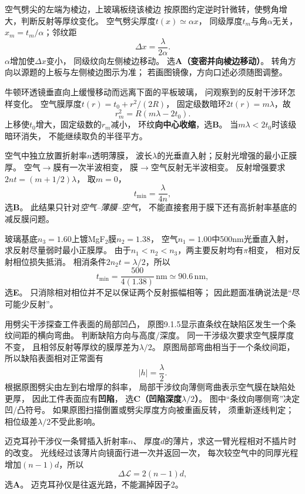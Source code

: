 \problemtext 空气劈尖的左端为棱边，上玻璃板绕该棱边
按原图约定逆时针微转，使劈角增大，判断反射等厚纹变化。
\workings
空气劈尖厚度$t(x)\simeq\alpha x$，
同级厚度$t_m$与角$\alpha$无关，
$x_m=t_m/\alpha$；邻纹距
\[
\Delta x=\frac{\lambda}{2\alpha}.
\]
$\alpha$增加使$\Delta x$变小，
同级纹向左侧棱边移动。
选\textbf{A（变密并向棱边移动）}。
\crosscheck 转角方向以源题的上板与左侧棱边图示为准；
若画图镜像，方向口述必须随图调整。

\problemtext 牛顿环透镜垂直向上缓慢移动而远离下面的平板玻璃，
问观察到的反射干涉环怎样变化。
\workings
空气膜厚度$t(r)=t_0+r^2/(2R)$，
固定级数暗环$2t(r)=m\lambda$，故
\[
r_m^2=R(m\lambda-2t_0).
\]
上移使$t_0$增大，固定级数的$r_m$减小，
环纹\textbf{向中心收缩}，选\textbf{B}。
\crosscheck 当$m\lambda<2t_0$时该级暗环消失，
不能继续取负的半径平方。

\problemtext 空气中独立放置折射率$n$透明薄膜，
波长$\lambda$的光垂直入射；反射光增强的最小正膜厚。
\workings
空气$\to$膜有一次半波相变，
膜$\to$空气反射无半波相变。
反射增强要求$2nt=(m+1/2)\lambda$，
取$m=0$，
\[
\boxed{t_{\min}=\frac{\lambda}{4n}},
\]
选\textbf{B}。
\crosscheck 此结果只针对\emph{空气--薄膜--空气}，
不能直接套用于膜下还有高折射率基底的减反膜问题。

\problemtext 玻璃基底$n_3=1.60$上镀MgF$_2$膜$n_2=1.38$，
空气$n_1=1.00$中500nm光垂直入射，求反射尽量弱时最小正膜厚。
\workings
由于$n_1<n_2<n_3$，两主要反射均有$\pi$相变，
相对反射相位损失抵消。
相消条件$2n_2t=\lambda/2$，所以
\[
\boxed{t_{\min}=\frac{500}{4(1.38)}\,\mathrm{nm}
\simeq90.6\,\mathrm{nm}},
\]
选\textbf{E}。
\crosscheck 只消除相对相位并不足以保证两个反射振幅相等；
因此题面准确说法是“尽可能少反射”。

\problemtext 用劈尖干涉探查工件表面的局部凹凸，
原图9.1.5显示直条纹在缺陷区发生一个条纹间距的横向弯曲。
判断缺陷方向与高度/深度。
\workings
同一干涉级次要求空气膜厚度不变，
且相邻反射等厚纹的膜厚差为$\lambda/2$。
原图局部弯曲相当于一个条纹间距，
所以缺陷表面相对正常面有
\[
\boxed{|h|=\frac{\lambda}{2}}.
\]
根据原图劈尖由左到右增厚的斜率，
局部干涉纹向薄侧弯曲表示空气膜在缺陷处更厚，
因此工件表面应有\textbf{凹陷}，
选\textbf{C（凹陷深度$\lambda/2$）}。
\crosscheck 图中“条纹向哪侧弯”决定凹/凸符号。
如果原图扫描倒置或劈尖厚度方向被重画反转，
须重新逐线判定；相位级差$\lambda/2$不受此影响。

\problemtext 迈克耳孙干涉仪一条臂插入折射率$n$、
厚度$d$的薄片，求这一臂光程相对不插片时的改变。
\workings
光线经过该薄片向镜面行进一次并返回一次，
每次较空气中的同厚光程增加$(n-1)d$，所以
\[
\boxed{\Delta\mathcal L=2(n-1)d},
\]
选\textbf{A}。
\crosscheck 迈克耳孙仪是往返光路，不能漏掉因子2。
